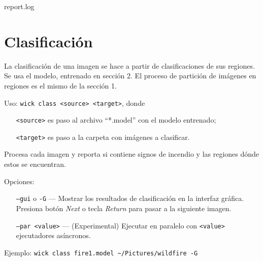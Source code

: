 \documentclass{article}
\begin{document}
\begin{center}
    
                    {report.log} 
\end{center}
\begin{center}
    \resizebox{\textwidth}{!}{  }
\end{center}


\section{Clasificación}

La clasificación de una imagen se hace a partir de clasificaciones de sus regiones.
Se usa el modelo, entrenado en sección 2.
El proceso de partición de imágenes en regiones es el mismo de la sección 1.

\medskip
\noindent
Uso: \verb|wick class <source> <target>|, donde
\begin{itemize}[leftmargin=9em]
\item[\texttt{<source>}] es paso al archivo ``*.model'' con el modelo entrenado;
\item[\texttt{<target>}] es paso a la carpeta con imágenes a clasificar.
\end{itemize}

Procesa cada imagen y reporta si contiene signos de incendio y las regiones dónde estos se encuentran.

\medskip
\noindent
Opciones:
\begin{itemize}[align=left]
\item[\texttt{--gui} o \texttt{-G}] --- Mostrar los resultados de clasificación en la interfaz gráfica. Presiona botón \emph{Next} o tecla \emph{Return} para pasar a la siguiente imagen.
\item[\texttt{--par <value>}] --- (Experimental) Ejecutar en paralelo con \verb|<value>| ejecutadores asíncronos.
\end{itemize}

\noindent
Ejemplo: \verb|wick class fire1.model ~/Pictures/wildfire -G|
\end{document}
